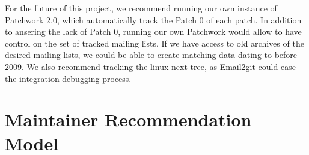For the future of this project, we recommend running our own instance of Patchwork 2.0, which automatically track the Patch 0 of each patch. In addition to ansering the lack of Patch 0, running our own Patchwork would allow to have control on the set of tracked mailing lists. If we have access to old archives of the desired mailing lists, we could be able to create matching data dating to before 2009. We also recommend tracking the linux-next tree, as Email2git could ease the integration debugging process. 


\section{Maintainer Recommendation Model}